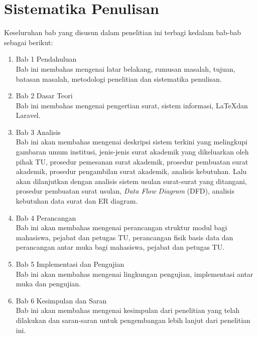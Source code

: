 \section{Sistematika Penulisan}
\label{sec:sistematika_penulisan}
Keseluruhan bab yang disusun dalam penelitian ini terbagi kedalam bab-bab sebagai berikut:
\begin{enumerate}
	\item Bab 1 Pendahuluan \\
	Bab ini membahas mengenai latar belakang, rumusan masalah, tujuan, batasan masalah, metodologi penelitian dan sistematika penulisan.
	\item Bab 2 Dasar Teori \\
	Bab ini membahas mengenai pengertian surat, sistem informasi, \LaTeX dan Laravel.
	\item Bab 3 Analisis \\
	Bab ini akan membahas mengenai deskripsi sistem terkini yang melingkupi gambaran umum institusi, jenis-jenis surat akademik yang dikeluarkan oleh pihak TU, prosedur pemesanan surat akademik, prosedur pembuatan surat akademik, prosedur pengambilan surat akademik, analisis kebutuhan. Lalu akan dilanjutkan dengan analisis sistem usulan surat-surat yang ditangani, prosedur pembuatan surat usulan, \textit{Data Flow Diagram} (DFD), analisis kebutuhan data surat dan ER diagram.
	\item Bab 4 Perancangan \\
	Bab ini akan membahas mengenai perancangan struktur modul bagi mahasiswa, pejabat dan petugas TU, perancangan fisik basis data dan perancangan antar muka bagi mahasiswa, pejabat dan petugas TU.
	\item Bab 5 Implementasi dan Pengujian \\
	Bab ini akan membahas mengenai lingkungan pengujian, implementasi antar muka dan pengujian.
	\item Bab 6 Kesimpulan dan Saran \\ 
	Bab ini akan membahas mengenai kesimpulan dari penelitian yang telah dilakukan dan saran-saran untuk pengembangan lebih lanjut dari penelitian ini.
\end{enumerate}